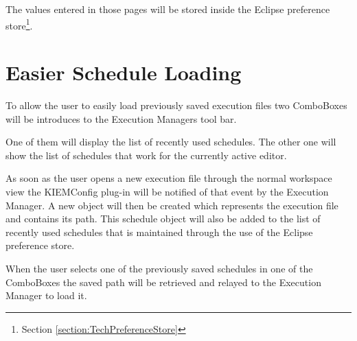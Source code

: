The values entered in those pages will be stored inside the Eclipse preference
store\footnote{Section \ref{section:TechPreferenceStore}}.

\section{Easier Schedule Loading}
\label{section:ConfConceptsEasyLoading}
To allow the user to easily load previously saved execution files two ComboBoxes will be introduces
to the Execution Managers tool bar.

One of them will display the list of recently used schedules. The other one will show the
list of schedules that work for the currently active editor.

As soon as the user opens a new execution file through the normal workspace
view the \ac{KIEMConfig} plug-in will be notified of that event by the Execution Manager.
A new object will then be created which represents the execution file and contains its path.
This schedule object will also be added to the list of recently used schedules that is maintained through the 
use of the Eclipse preference store.

When the user selects one of the previously saved schedules in one of the
ComboBoxes the saved path will be retrieved and relayed to the Execution Manager to
load it.